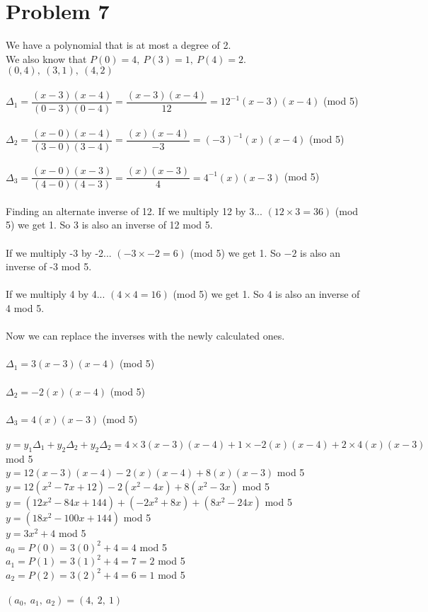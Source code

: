 \documentclass[11pt,letterpaper]{article}
\begin{document}
\section*{Problem 7}
We have a polynomial that is at most a degree of 2. \\We also know that $P(0)=4,~P(3)=1,~P(4)=2.$\\
$(0,4),~(3,1),~(4,2)$
\\\\
$\Delta_1 = \dfrac{(x-3)(x-4)}{(0-3)(0-4)} = \dfrac{(x-3)(x-4)}{12} = 12^{-1}(x-3)(x-4)$   (mod 5)\\\\
$\Delta_2 = \dfrac{(x-0)(x-4)}{(3-0)(3-4)} = \dfrac{(x)(x-4)}{-3}= (-3)^{-1}(x)(x-4)$ (mod 5)\\\\
$\Delta_3 = \dfrac{(x-0)(x-3)}{(4-0)(4-3)} = \dfrac{(x)(x-3)}{4} = 4^{-1}(x)(x-3)$ (mod 5)\\\\
Finding an alternate inverse of 12.
If we multiply 12 by 3... $(12\times3=36)$ (mod 5) we get 1. So 3 is also an inverse of 12 mod 5.\\\\
If we multiply -3 by -2... $(-3\times-2=6)$ (mod 5) we get 1. So $-2$ is also an inverse of -3 mod 5.\\\\
If we multiply 4 by 4... $(4\times4=16)$ (mod 5) we get 1. So $4$ is also an inverse of 4 mod 5.\\\\
Now we can replace the inverses with the newly calculated ones.\\\\
$\Delta_1 = 3(x-3)(x-4)$   (mod 5)\\\\
$\Delta_2 =-2(x)(x-4)$ (mod 5)\\\\
$\Delta_3 = 4(x)(x-3)$ (mod 5)\\\\
$y = y_1\Delta_1 + y_2\Delta_2+ y_2\Delta_2 = 4\times3(x-3)(x-4) + 1\times -2(x)(x-4) + 2\times 4(x)(x-3)$ mod 5\\
$y=12(x-3)(x-4)-2(x)(x-4)+8(x)(x-3)$ mod 5\\
$y= 12(x^2-7x+12)-2(x^2-4x)+8(x^2-3x)$ mod 5\\
$y= (12x^2-84x+144)+(-2x^2+8x)+(8x^2-24x)$ mod 5\\
$y= (18x^2-100x+144)$ mod 5\\
$y = 3x^2 + 4$ mod 5\\
$a_0 = P(0)= 3(0)^2 + 4 = 4$ mod 5\\
$a_1 = P(1)= 3(1)^2 + 4= 7=2$ mod 5\\
$a_2 = P(2)= 3(2)^2 + 4 = 6=1$ mod 5\\
\\
$(a_0,~a_1,~a_2) = (4,~2,~1)$
\end{document}
